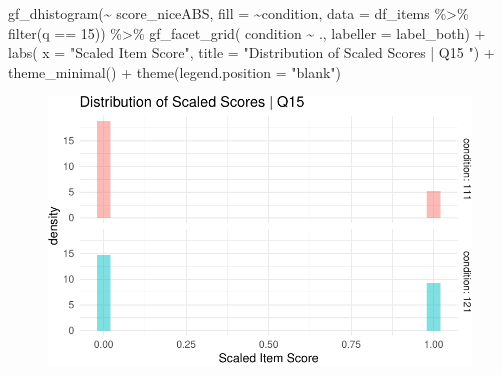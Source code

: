 \documentclass[
  letterpaper,
  DIV=11,
  numbers=noendperiod]{scrreprt}
\newenvironment{Shaded}{\begin{snugshade}}{\end{snugshade}}
\newcommand{\AttributeTok}[1]{\textcolor[rgb]{0.40,0.45,0.13}{#1}}
\newcommand{\DecValTok}[1]{\textcolor[rgb]{0.68,0.00,0.00}{#1}}
\newcommand{\FunctionTok}[1]{\textcolor[rgb]{0.28,0.35,0.67}{#1}}
\newcommand{\NormalTok}[1]{\textcolor[rgb]{0.00,0.23,0.31}{#1}}
\newcommand{\SpecialCharTok}[1]{\textcolor[rgb]{0.37,0.37,0.37}{#1}}
\newcommand{\StringTok}[1]{\textcolor[rgb]{0.13,0.47,0.30}{#1}}
\begin{document}
\begin{Shaded}
\begin{Highlighting}[]
\FunctionTok{gf\_dhistogram}\NormalTok{(}\SpecialCharTok{\textasciitilde{}}\NormalTok{ score\_niceABS, }\AttributeTok{fill =} \SpecialCharTok{\textasciitilde{}}\NormalTok{condition, }\AttributeTok{data =}\NormalTok{ df\_items }\SpecialCharTok{\%\textgreater{}\%} \FunctionTok{filter}\NormalTok{(q }\SpecialCharTok{==} \DecValTok{15}\NormalTok{)) }\SpecialCharTok{\%\textgreater{}\%} 
  \FunctionTok{gf\_facet\_grid}\NormalTok{( condition }\SpecialCharTok{\textasciitilde{}}\NormalTok{ ., }\AttributeTok{labeller =}\NormalTok{ label\_both) }\SpecialCharTok{+} 
  \FunctionTok{labs}\NormalTok{( }\AttributeTok{x =} \StringTok{"Scaled Item Score"}\NormalTok{, }\AttributeTok{title =} \StringTok{"Distribution of Scaled Scores | Q15 "}\NormalTok{) }\SpecialCharTok{+} 
  \FunctionTok{theme\_minimal}\NormalTok{() }\SpecialCharTok{+} \FunctionTok{theme}\NormalTok{(}\AttributeTok{legend.position =} \StringTok{"blank"}\NormalTok{)}
\end{Highlighting}
\end{Shaded}

\begin{figure}[H]

{\centering \includegraphics{analysis/SGC3A/2_sgc3A_scoring_files/figure-pdf/Q15-distribution-1.pdf}

}

\end{figure}
\end{document}
